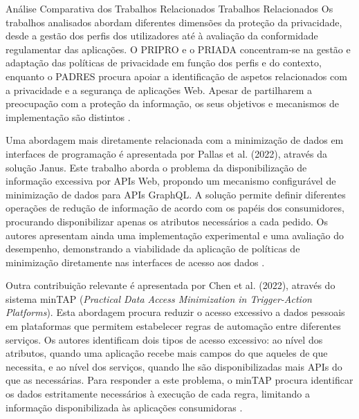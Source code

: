 \documentclass[12pt,reqno, twoside]{amsbook}
\makeatletter
\def\section{\@startsection{section}{1}%
      \z@{.5\linespacing\@plus.7\linespacing}{.25\linespacing}%
      {\normalfont\bfseries\flushleft}}
\def\subsection{\@startsection{subsection}{2}%
      \z@{.5\linespacing\@plus.7\linespacing}{.25\linespacing}%
      {\normalfont\bfseries\flushleft}}
\theoremstyle{plain}
\numberwithin{equation}{chapter}
\numberwithin{table}{chapter}
\numberwithin{figure}{chapter}
\numberwithin{section}{chapter}
\makeatother
\begin{document}
\section{Análise Comparativa dos Trabalhos Relacionados}
\subsection{Trabalhos Relacionados}
Os trabalhos analisados abordam diferentes dimensões da proteção da privacidade, desde a gestão dos perfis dos utilizadores até à avaliação da conformidade regulamentar das aplicações. O PRIPRO e o PRIADA concentram-se na gestão e adaptação das políticas de privacidade em função dos perfis e do contexto, enquanto o PADRES procura apoiar a identificação de aspetos relacionados com a privacidade e a segurança de aplicações Web. Apesar de partilharem a preocupação com a proteção da informação, os seus objetivos e mecanismos de implementação são distintos \cite{cesconetto2020,lopes2020priada,pereira2022}.

Uma abordagem mais diretamente relacionada com a minimização de dados em interfaces de programação é apresentada por Pallas et al. (2022), através da solução Janus. Este trabalho aborda o problema da disponibilização de informação excessiva por APIs Web, propondo um mecanismo configurável de minimização de dados para APIs GraphQL. A solução permite definir diferentes operações de redução de informação de acordo com os papéis dos consumidores, procurando disponibilizar apenas os atributos necessários a cada pedido. Os autores apresentam ainda uma implementação experimental e uma avaliação do desempenho, demonstrando a viabilidade da aplicação de políticas de minimização diretamente nas interfaces de acesso aos dados \cite{pallas2022janus}.

Outra contribuição relevante é apresentada por Chen et al. (2022), através do sistema minTAP (\textit{Practical Data Access Minimization in Trigger-Action Platforms}). Esta abordagem procura reduzir o acesso excessivo a dados pessoais em plataformas que permitem estabelecer regras de automação entre diferentes serviços. Os autores identificam dois tipos de acesso excessivo: ao nível dos atributos, quando uma aplicação recebe mais campos do que aqueles de que necessita, e ao nível dos serviços, quando lhe são disponibilizadas mais APIs do que as necessárias. Para responder a este problema, o minTAP procura identificar os dados estritamente necessários à execução de cada regra, limitando a informação disponibilizada às aplicações consumidoras \cite{chen2022mintap}.
\end{document}
